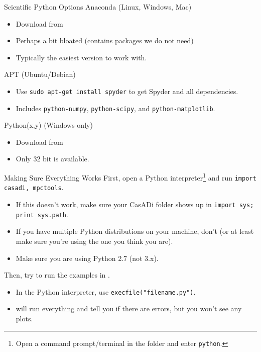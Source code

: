 \documentclass[xcolor=dvipsnames]{beamer}
\begin{document}
\begin{frame}{Scientific Python Options}
    Anaconda (Linux, Windows, Mac)
    \begin{itemize}
        \item Download from 
        \item Perhaps a bit bloated (contains packages we do not need)
        \item Typically the easiest version to work with.
    \end{itemize}
    
    \medskip
    
    APT (Ubuntu/Debian)
    \begin{itemize}
        \item Use \lstinline[style=shell]@sudo apt-get install spyder@ to get Spyder and all dependencies.
        \item Includes \texttt{python-numpy}, \texttt{python-scipy}, and \texttt{python-matplotlib}.
    \end{itemize}
    
    \medskip
    
    Python(x,y) (Windows only)
    \begin{itemize}
        \item Download from 
        \item Only 32 bit is available.
    \end{itemize}
\end{frame}

\begin{frame}{Making Sure Everything Works}
    First, open a Python interpreter\footnote{Open a command prompt/terminal in the  folder and enter \lstinline[style=shell]!python!.} and run \lstinline[style=python]!import casadi, mpctools!.
    \begin{itemize}
        \item If this doesn't work, make sure your CasADi folder shows up in \lstinline[style=python]!import sys; print sys.path!.
        \item If you have multiple Python distributions on your machine, don't (or at least make sure you're using the one you think you are).
        \item Make sure you are using Python 2.7 (not 3.x).
    \end{itemize}
    
    \medskip
    
    Then, try to run the examples in .
    \begin{itemize}
        \item In the Python interpreter, use \lstinline[style=python]!execfile("filename.py")!.
        \item {} will run everything and tell you if there are errors, but you won't see any plots.
    \end{itemize}
\end{frame}
\end{document}
